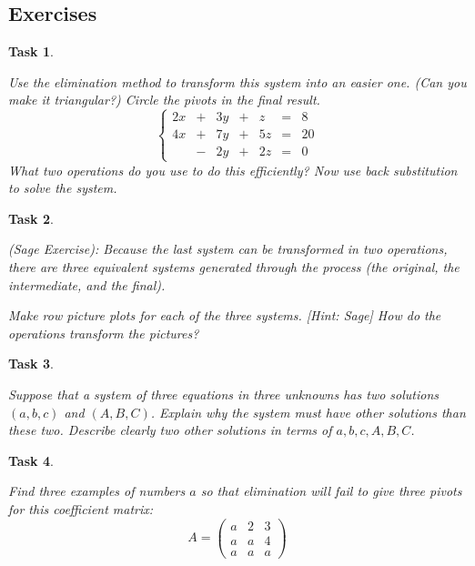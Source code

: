 \documentclass[10pt,]{book}
\theoremstyle{plain}
\numberwithin{equation}{section}
\newtheorem{task}{Task}[chapter]
\begin{document}
\subsection[Exercises]{Exercises}\label{subsection-28}
\begin{task}
\label{task-38}

          Use the elimination method to transform this system into an easier
          one. (Can you make it triangular?) Circle the pivots in the final
          result.
          \[
            \left\{
            \begin{array}{rrrrrrr}
            2x & + & 3y & + &  z & = & 8\\
            4x & + & 7y & + & 5z & = & 20 \\
               & - & 2y & + & 2z & = & 0
            \end{array}\right.
          \]
          What two operations do you use to do this efficiently? Now use back
          substitution to solve the system.
        \end{task}
\begin{task}
\label{task-39}

            \emph{(Sage Exercise)}:
            Because the last system can be transformed in two operations, there
            are three equivalent systems generated through the process
            (the original, the intermediate, and the final).
\par

            Make row picture plots for each of the three systems. [Hint: Sage]
            How do the operations transform the pictures?
\end{task}
\begin{task}
\label{task-40}

          Suppose that a system of three equations in three unknowns has two
          solutions \((a,b,c)\) and \((A,B,C)\). Explain why the system must have
          other solutions than these two. Describe clearly two other solutions
          in terms of \(a,b,c,A,B,C\).
        \end{task}
\begin{task}
\label{task-41}

          Find three examples of numbers \(a\) so that elimination will fail to
          give three pivots for this coefficient matrix:
          \[
            A = \begin{pmatrix}
            a & 2 & 3 \\ a & a & 4 \\ a & a & a
            \end{pmatrix}
          \]\end{task}
\end{document}
